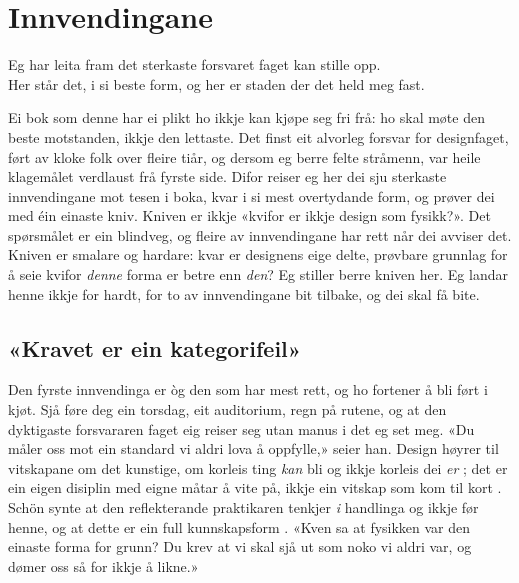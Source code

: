 \chapter{Innvendingane}

\begin{motto}
Eg har leita fram det sterkaste forsvaret faget kan stille opp.\\ Her står det, i si beste form, og her er staden der det held meg fast.
\end{motto}

Ei bok som denne har ei plikt ho ikkje kan kjøpe seg fri frå: ho skal møte den beste motstanden, ikkje den lettaste. Det finst eit alvorleg forsvar for designfaget, ført av kloke folk over fleire tiår, og dersom eg berre felte stråmenn, var heile klagemålet verdlaust frå fyrste side. Difor reiser eg her dei sju sterkaste innvendingane mot tesen i boka, kvar i si mest overtydande form, og prøver dei med éin einaste kniv. Kniven er ikkje «kvifor er ikkje design som fysikk?». Det spørsmålet er ein blindveg, og fleire av innvendingane har rett når dei avviser det. Kniven er smalare og hardare: kvar er designens eige delte, prøvbare grunnlag for å seie kvifor \emph{denne} forma er betre enn \emph{den}? Eg stiller berre kniven her. Eg landar henne ikkje for hardt, for to av innvendingane bit tilbake, og dei skal få bite.

\section{«Kravet er ein kategorifeil»}

Den fyrste innvendinga er òg den som har mest rett, og ho fortener å bli ført i kjøt. Sjå føre deg ein torsdag, eit auditorium, regn på rutene, og at den dyktigaste forsvararen faget eig reiser seg utan manus i det eg set meg. «Du måler oss mot ein standard vi aldri lova å oppfylle,» seier han. Design høyrer til vitskapane om det kunstige, om korleis ting \emph{kan} bli og ikkje korleis dei \emph{er} \autocite{simon1969sciences}; det er ein eigen disiplin med eigne måtar å vite på, ikkje ein vitskap som kom til kort \autocite{cross1982, cross2001discipline}. Schön synte at den reflekterande praktikaren tenkjer \emph{i} handlinga og ikkje før henne, og at dette er ein full kunnskapsform \autocite{schon1983}. «Kven sa at fysikken var den einaste forma for grunn? Du krev at vi skal sjå ut som noko vi aldri var, og dømer oss så for ikkje å likne.»

